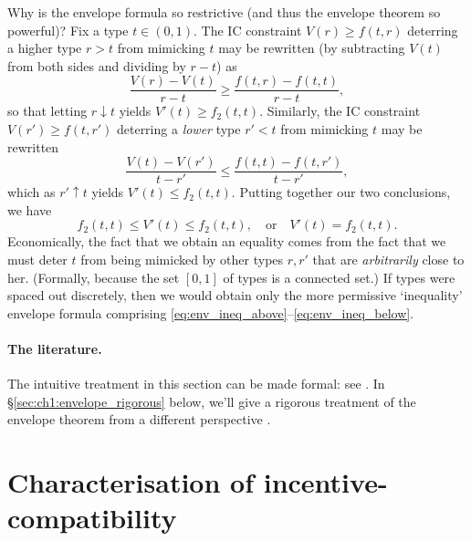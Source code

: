 \begin{remark}
	\label{remark:env_powerful}
	Why is the envelope formula so restrictive (and thus the envelope theorem so powerful)?
	Fix a type $t \in (0,1)$.
	The IC constraint $V(r) \geq f(t,r)$
	deterring a higher type $r>t$ from mimicking $t$
	may be rewritten (by subtracting $V(t)$ from both sides and dividing by $r-t$) as
	\begin{equation}
		\frac{V(r) - V(t)}{r-t} \geq \frac{f(t,r) - f(t,t)}{r-t} ,
		\label{eq:env_ineq_above}
	\end{equation}
	so that letting $r \downarrow t$ yields $V'(t) \geq f_2(t,t)$.
	Similarly, the IC constraint $V(r') \geq f(t,r')$
	deterring a \emph{lower} type $r'<t$ from mimicking $t$
	may be rewritten
	\begin{equation}
		\frac{V(t) - V(r')}{t-r'} \leq \frac{f(t,t) - f(t,r')}{t-r'} ,
		\label{eq:env_ineq_below}
	\end{equation}
	which as $r' \uparrow t$ yields $V'(t) \leq f_2(t,t)$.
	Putting together our two conclusions, we have
	\begin{equation*}
		f_2(t,t) \leq V'(t) \leq f_2(t,t) ,
		\quad \text{or} \quad
		V'(t) = f_2(t,t) .
	\end{equation*}
	Economically, the fact that we obtain an equality comes from the fact that we must deter $t$ from being mimicked by other types $r,r'$ that are \emph{arbitrarily} close to her. (Formally, because the set $[0,1]$ of types is a connected set.)
	If types were spaced out discretely, then we would obtain only the more permissive `inequality' envelope formula comprising \eqref{eq:env_ineq_above}--\eqref{eq:env_ineq_below}.
\end{remark}


\paragraph{The literature.}
The intuitive treatment in this section can be made formal: see \textcite{Sinander2022}.
In §\ref{sec:ch1:envelope_rigorous} below, we'll give a rigorous treatment of the envelope theorem from a different perspective \parencite{MilgromSegal2002}.



\section{Characterisation of incentive-compatibility}
\label{sec:ch1:ic}

